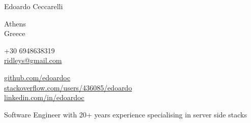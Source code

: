 \documentclass[10pt, a4paper]{article}
\begin{document}
{\LARGE Edoardo Ceccarelli}\\[.2cm]

\begin{multicols}{2}

Athens\\
Greece\\

\vspace{-10pt}

+30 6948638319\\
\href{mailto:ridleys@gmail.com}{ridleys@gmail.com}\\


\columnbreak

\href{http://github.com/edoardoc}{github.com/edoardoc}\\
\href{http://stackoverflow.com/users/436085/edoardo}{stackoverflow.com/users/436085/edoardo}\\
\href{http://linkedin.com/in/edoardoc}{linkedin.com/in/edoardoc}\\
\end{multicols}

\vspace{30pt}

Software Engineer with 20+ years experience specialising in server side
stacks
\end{document}
